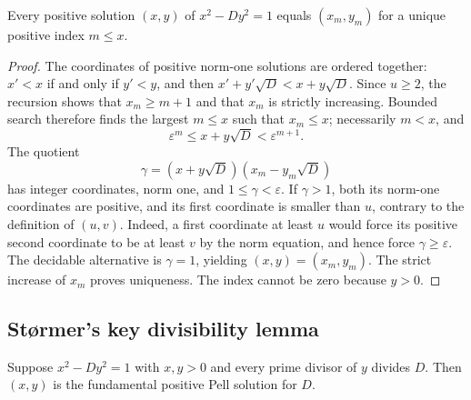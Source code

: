 \begin{lemma}
\label{lem:stormer-pell-powers}
Every positive solution $(x,y)$ of $x^2-Dy^2=1$ equals $(x_m,y_m)$ for a unique
positive index $m\le x$.
\end{lemma}

\begin{proof}
The coordinates of positive norm-one solutions are ordered together:
$x'<x$ if and only if $y'<y$, and then
$x'+y'\sqrt D<x+y\sqrt D$.  Since $u\ge2$, the recursion shows that
$x_m\ge m+1$ and that $x_m$ is strictly increasing.  Bounded search therefore
finds the largest $m\le x$ such that $x_m\le x$; necessarily $m<x$, and
\[
     \varepsilon^m\le x+y\sqrt D<\varepsilon^{m+1}.
\]
The quotient
\[
 \gamma=(x+y\sqrt D)(x_m-y_m\sqrt D)
\]
has integer coordinates, norm one, and $1\le\gamma<\varepsilon$.
If $\gamma>1$, both its norm-one coordinates are positive, and its first
coordinate is smaller than $u$, contrary to the definition of $(u,v)$.
Indeed, a first coordinate at least $u$ would force its positive second
coordinate to be at least $v$ by the norm equation, and hence force
$\gamma\geq\varepsilon$.
The decidable alternative is $\gamma=1$, yielding $(x,y)=(x_m,y_m)$.
The strict increase of $x_m$ proves uniqueness.  The index cannot be zero
because $y>0$.
\end{proof}

\subsection{St\o rmer's key divisibility lemma}

\begin{lemma}
\label{lem:stormer-key}
Suppose $x^2-Dy^2=1$ with $x,y>0$ and every prime divisor of $y$ divides $D$.
Then $(x,y)$ is the fundamental positive Pell solution for $D$.
\end{lemma}

